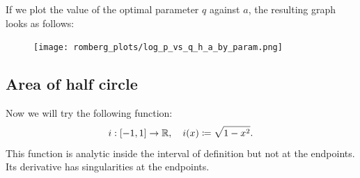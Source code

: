 If we plot the value of the optimal parameter \(q\) against \(a\), the resulting graph looks as follows: 

\begin{figure}[H]
\centering
\begin{minipage}{0.45\textwidth}
\centering
\texttt{[image: romberg\_plots/log\_p\_vs\_q\_h\_a\_by\_param.png]}
\end{minipage}
\end{figure}

\subsection{Area of half circle}

Now we will try the following function:
\[
i: [-1, 1] \rightarrow \mathbb{R}, \quad i(x)\coloneqq \sqrt{1-x^2}.
\]
This function is analytic inside the interval of definition but not at the endpoints. Its derivative has singularities at the endpoints.

